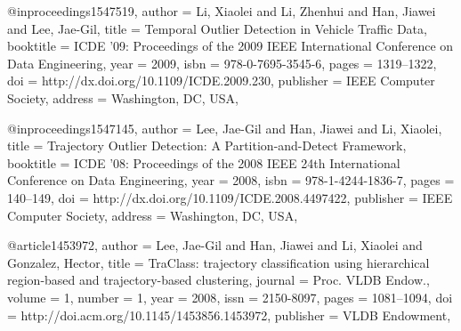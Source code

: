 


@inproceedings{1547519,
 author = {Li, Xiaolei and Li, Zhenhui and Han, Jiawei and Lee, Jae-Gil},
 title = {Temporal Outlier Detection in Vehicle Traffic Data},
 booktitle = {ICDE '09: Proceedings of the 2009 IEEE International Conference on Data Engineering},
 year = {2009},
 isbn = {978-0-7695-3545-6},
 pages = {1319--1322},
 doi = {http://dx.doi.org/10.1109/ICDE.2009.230},
 publisher = {IEEE Computer Society},
 address = {Washington, DC, USA},
 }

@inproceedings{1547145,
 author = {Lee, Jae-Gil and Han, Jiawei and Li, Xiaolei},
 title = {Trajectory Outlier Detection: A Partition-and-Detect Framework},
 booktitle = {ICDE '08: Proceedings of the 2008 IEEE 24th International Conference on Data Engineering},
 year = {2008},
 isbn = {978-1-4244-1836-7},
 pages = {140--149},
 doi = {http://dx.doi.org/10.1109/ICDE.2008.4497422},
 publisher = {IEEE Computer Society},
 address = {Washington, DC, USA},
 }

@article{1453972,
 author = {Lee, Jae-Gil and Han, Jiawei and Li, Xiaolei and Gonzalez, Hector},
 title = {TraClass: trajectory classification using hierarchical region-based and trajectory-based clustering},
 journal = {Proc. VLDB Endow.},
 volume = {1},
 number = {1},
 year = {2008},
 issn = {2150-8097},
 pages = {1081--1094},
 doi = {http://doi.acm.org/10.1145/1453856.1453972},
 publisher = {VLDB Endowment},
 }